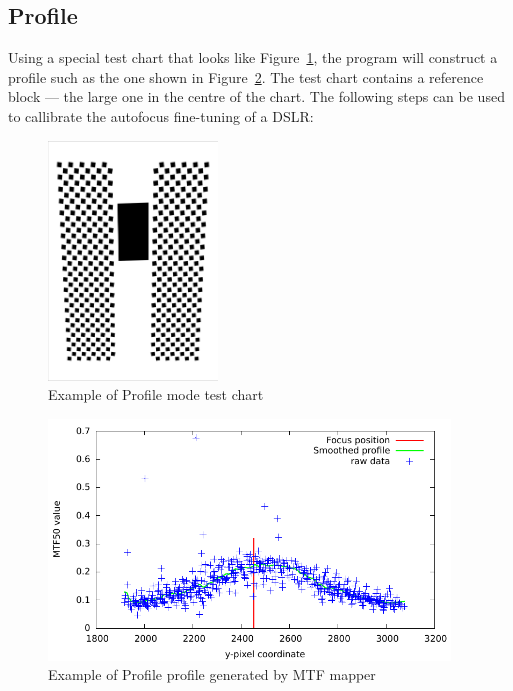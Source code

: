 \documentclass[a4paper]{article}
\begin{document}
\subsection{Profile}
Using a special test chart that looks like
Figure~\ref{fig:profile_test_chart}, the program will construct a profile
such as the one shown in Figure~\ref{fig:sample_profile}. The test chart
contains a reference block --- the large one in the centre of the chart. The
following steps can be used to callibrate the autofocus fine-tuning of a
DSLR:

\begin{figure}
\centering
\includegraphics[width=0.4\textwidth]{figures/mtf_profile_test_chart}
\caption{Example of Profile mode test chart}
\label{fig:profile_test_chart}
\end{figure}

\begin{figure}
\centering
\includegraphics[width=0.95\textwidth]{figures/sample_profile}
\caption{Example of Profile profile generated by MTF mapper}
\label{fig:sample_profile}
\end{figure}
\end{document}
